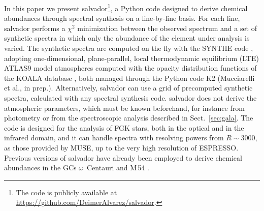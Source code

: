 \documentclass{aa}
\newcommand{\salvador}{salvador}   %
\begin{document}
In this paper we present \salvador{}\footnote{The code is publicly
available at \url{https://github.com/DeimerAlvarez/salvador}.}, a
Python code designed to derive chemical abundances through spectral
synthesis on a line-by-line basis. For each line, \salvador{} performs
a $\chi^2$ minimization between the observed spectrum and a set of
synthetic spectra in which only the abundance of the element under
analysis is varied. The synthetic spectra are computed on the fly with
the SYNTHE code \citep{Kurucz1993b, Sbordone2004, Kurucz2005}, adopting
one-dimensional, plane-parallel, local thermodynamic equilibrium (LTE)
ATLAS9 model atmospheres \citep{Kurucz1993, Kurucz2005} computed with the
opacity distribution functions of the KOALA database
\citep{Mucciarelli2026}, both
managed through the Python code K2 (Mucciarelli et al., in prep.). Alternatively, \salvador{} can use a grid of
precomputed synthetic spectra, calculated with any spectral synthesis
code. \salvador{} does not derive the atmospheric parameters, which
must be known beforehand, for instance from photometry or from the
spectroscopic analysis described in Sect.~\ref{sec:gala}. The code is
designed for the analysis of FGK stars, both in the optical and in the
infrared domain, and it can handle spectra with resolving powers from
$R\sim3000$, as those provided by MUSE, up to the very high resolution
of ESPRESSO. Previous versions of \salvador{} have already been
employed to derive chemical abundances in the GCs $\omega$~Centauri
and M\,54 \citep{AlvarezGaray2024, AlvarezGaray2026}.
\end{document}
